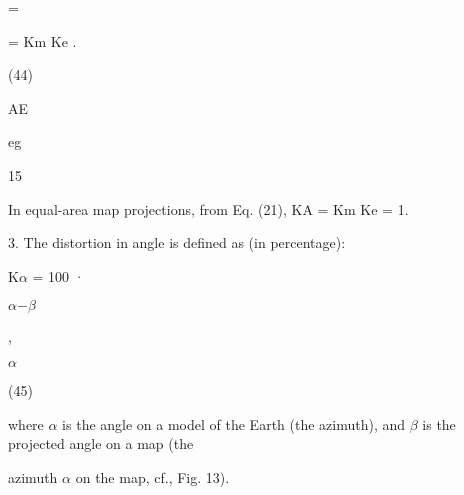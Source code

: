 \documentclass[a4paper,portrait,12pt]{article}
\begin{document}
=


\begin{flushleft}
= Km Ke .
\end{flushleft}


(44)


\begin{flushleft}
AE
\end{flushleft}


\begin{flushleft}
eg
\end{flushleft}





15





\begin{flushleft}
\newpage
In equal-area map projections, from Eq. (21), KA = Km Ke = 1.
\end{flushleft}


\begin{flushleft}
3. The distortion in angle is defined as (in percentage):
\end{flushleft}


\begin{flushleft}
K$\alpha$ = 100 ·
\end{flushleft}





\begin{flushleft}
$\alpha$$-$$\beta$
\end{flushleft}


,


\begin{flushleft}
$\alpha$
\end{flushleft}





(45)





\begin{flushleft}
where $\alpha$ is the angle on a model of the Earth (the azimuth), and $\beta$ is the projected angle on a map (the
\end{flushleft}


\begin{flushleft}
azimuth $\alpha$ on the map, cf., Fig. 13).
\end{flushleft}
\end{document}
